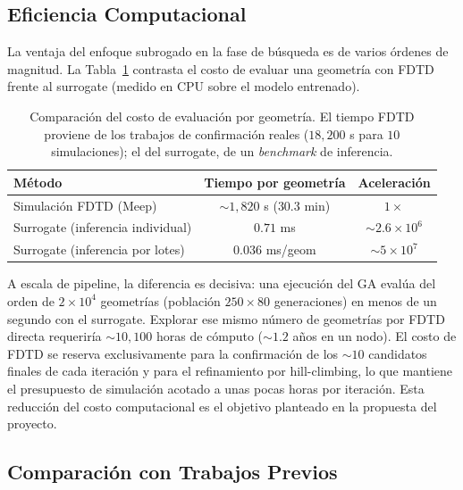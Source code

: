 \subsection{Eficiencia Computacional}\label{subsec:eficiencia}

La ventaja del enfoque subrogado en la fase de búsqueda es de varios órdenes de magnitud. La Tabla~\ref{tab:speedup} contrasta el costo de evaluar una geometría con FDTD frente al surrogate (medido en CPU sobre el modelo entrenado).

\begin{table}[H]
\centering
\small
\begin{tabular}{lcc}
\toprule
\textbf{Método} & \textbf{Tiempo por geometría} & \textbf{Aceleración} \\
\midrule
Simulación FDTD (Meep)        & ${\sim}1{,}820$ s ($30.3$ min) & $1\times$ \\
Surrogate (inferencia individual) & $0.71$ ms & ${\sim}2.6\times10^{6}$ \\
Surrogate (inferencia por lotes)  & $0.036$ ms/geom & ${\sim}5\times10^{7}$ \\
\bottomrule
\end{tabular}
\caption{Comparación del costo de evaluación por geometría. El tiempo FDTD proviene de los trabajos de confirmación reales ($18{,}200$ s para $10$ simulaciones); el del surrogate, de un \textit{benchmark} de inferencia.}
\label{tab:speedup}
\end{table}

A escala de pipeline, la diferencia es decisiva: una ejecución del GA evalúa del orden de $2 \times 10^4$ geometrías (población $250 \times 80$ generaciones) en menos de un segundo con el surrogate. Explorar ese mismo número de geometrías por FDTD directa requeriría ${\sim}10{,}100$ horas de cómputo (${\sim}1.2$ años en un nodo). El costo de FDTD se reserva exclusivamente para la confirmación de los ${\sim}10$ candidatos finales de cada iteración y para el refinamiento por hill-climbing, lo que mantiene el presupuesto de simulación acotado a unas pocas horas por iteración. Esta reducción del costo computacional es el objetivo planteado en la propuesta del proyecto.

\subsection{Comparación con Trabajos Previos}\label{subsec:comparacion}

